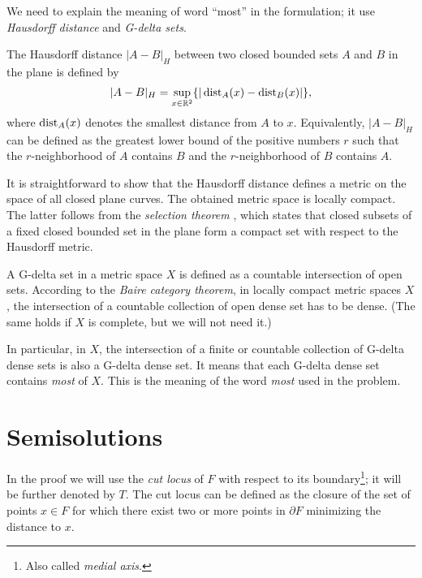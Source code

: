 We need to explain the meaning of word ``most'' in the formulation;
it use \emph{Hausdorff distance} and \emph{G-delta sets}.

The Hausdorff distance $|A-B|_H$ between two closed bounded sets $A$ and $B$ in the plane is defined by 
\[|A-B|_H=\sup_{x\in\mathbb{R}^2}\{|\operatorname{\rm dist}\nolimits_A(x)-\operatorname{\rm dist}\nolimits_B(x)|\},\]
where $\operatorname{\rm dist}\nolimits_A(x)$ denotes the smallest distance from $A$ to $x$.
Equivalently, $|A-B|_H$ can be defined as the greatest lower bound of the positive numbers $r$ such that the $r$-neighborhood of $A$ contains $B$ and the $r$-neighborhood of $B$ contains $A$.

It is straightforward to show that the Hausdorff distance defines a metric on the space of all closed plane curves.
The obtained metric space is locally compact.
The latter follows from the \emph{selection theorem} \cite[see \S18 in][]{blaschke},
which states that closed subsets of a fixed closed bounded set in the plane form a compact set with respect to the Hausdorff metric. 

A G-delta set in a metric space $X$ is defined as a countable intersection of open sets.
According to the \emph{Baire category theorem}, 
in locally compact metric spaces $X$,
the intersection of a countable collection of open dense set 
has to be dense.
(The same holds if $X$ is complete, but we will not need it.)

In particular, in $X$, 
the intersection of a finite or countable collection of G-delta dense sets is also a G-delta dense set. 
It means that each G-delta dense set contains {}\emph{most} of $X$.
This is the meaning of the word {}\emph{most} used in the problem.



\section*{Semisolutions}


In the proof we will use the \emph{cut locus}
of $F$ with respect to its boundary\footnote{Also called \emph{medial axis}.};
it will be further denoted by $T$.
The cut locus can be defined as the closure
of the set of points $x\in F$ 
for which there exist two or more points in $\partial F$ minimizing the distance to $x$.



